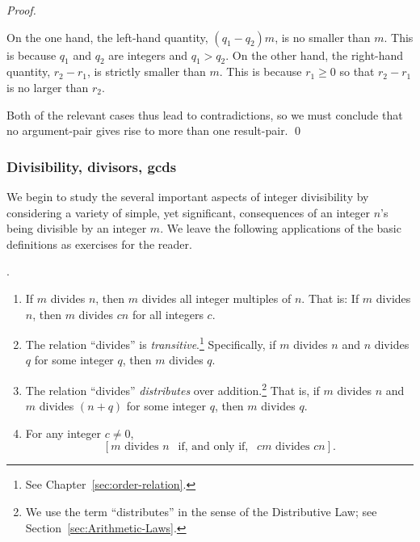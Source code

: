 \begin{proof}
\begin{itemize}
\smallskip

On the one hand, the left-hand quantity, $(q_1 - q_2) m$, is no smaller than $m$.  This is because $q_1$ and $q_2$ are integers and $q_1 > q_2$.  On the other hand, the right-hand quantity, $r_2 - r_1$, is strictly smaller than $m$.  This is because $r_1 \geq 0$ so that $r_2 - r_1$ is no larger than $r_2$.
\end{itemize}
Both of the relevant cases thus lead to contradictions, so we must conclude that no argument-pair gives rise to more than one result-pair.  \qed
\end{proof}


\subsubsection{Divisibility, divisors, {\sc gcd}s}
\label{sec:divisibility+GCD}

We begin to study the several important aspects of integer divisibility by considering a variety of simple, yet significant, consequences of an integer $n$'s being divisible by an integer $m$.  We leave the following applications of the basic definitions as exercises for the reader.

\begin{prop}.
\label{thm:basic-divisibility}
\begin{enumerate}
\item
If $m$ divides $n$, then $m$ divides all integer multiples of $n$. That is: If $m$ divides $n$, then $m$ divides $cn$ for all integers $c$.

\medskip\item
The relation ``divides'' is {\em transitive}.\footnote{See Chapter~\ref{sec:order-relation}.}  Specifically, if $m$ divides $n$ and $n$ divides $q$ for some integer $q$, then $m$ divides $q$.

\medskip\item
The relation ``divides'' {\em distributes} over addition.\footnote{We use the term ``distributes'' in the sense of the Distributive Law; see Section~\ref{sec:Arithmetic-Laws}.}  That is, if $m$ divides $n$ and $m$ divides $(n+q)$ for some integer $q$, then $m$ divides $q$.

\medskip\item 
For any integer $c \neq 0$,
\[ \left[m \mbox{ divides } n \ \ \mbox{ if, and only if, } \ \ cm \mbox{ divides } cn \right]. \]
\end{enumerate}
\end{prop}


